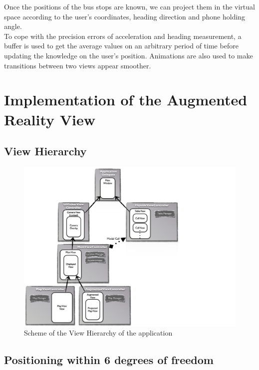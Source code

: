 Once the positions of the bus stops are known, we can project them in the virtual space according to the user's coordinates, heading direction and phone holding angle.\\

To cope with the precision errors of acceleration and heading measurement, a buffer is used to get the average values on an arbitrary period of time before updating the knowledge on the user's position. Animations are also used to make transitions between two views appear smoother.

\section{Implementation of the Augmented Reality View}
\label{sec:implementation_of_ar_view}

\subsection{View Hierarchy}

\begin{figure}[ht]
\center
\includegraphics[scale=0.5]{pics/client_view_hierarchy}
\caption{Scheme of the View Hierarchy of the application}
\label{fig:client_view_hierarchy}
\end{figure}

\subsection{Positioning within 6 degrees of freedom}

